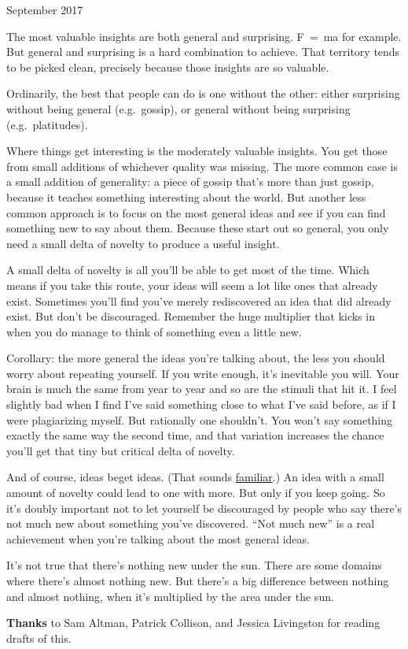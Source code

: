 September 2017

The most valuable insights are both general and surprising. F~=~ma for
example. But general and surprising is a hard combination to achieve.
That territory tends to be picked clean, precisely because those
insights are so valuable.

Ordinarily, the best that people can do is one without the other: either
surprising without being general (e.g.~gossip), or general without being
surprising (e.g.~platitudes).

Where things get interesting is the moderately valuable insights. You
get those from small additions of whichever quality was missing. The
more common case is a small addition of generality: a piece of gossip
that's more than just gossip, because it teaches something interesting
about the world. But another less common approach is to focus on the
most general ideas and see if you can find something new to say about
them. Because these start out so general, you only need a small delta of
novelty to produce a useful insight.

A small delta of novelty is all you'll be able to get most of the time.
Which means if you take this route, your ideas will seem a lot like ones
that already exist. Sometimes you'll find you've merely rediscovered an
idea that did already exist. But don't be discouraged. Remember the huge
multiplier that kicks in when you do manage to think of something even a
little new.

Corollary: the more general the ideas you're talking about, the less you
should worry about repeating yourself. If you write enough, it's
inevitable you will. Your brain is much the same from year to year and
so are the stimuli that hit it. I feel slightly bad when I find I've
said something close to what I've said before, as if I were plagiarizing
myself. But rationally one shouldn't. You won't say something exactly
the same way the second time, and that variation increases the chance
you'll get that tiny but critical delta of novelty.

And of course, ideas beget ideas. (That sounds
\href{ecw.html}{familiar}.) An idea with a small amount of novelty could
lead to one with more. But only if you keep going. So it's doubly
important not to let yourself be discouraged by people who say there's
not much new about something you've discovered. ``Not much new'' is a
real achievement when you're talking about the most general ideas.

It's not true that there's nothing new under the sun. There are some
domains where there's almost nothing new. But there's a big difference
between nothing and almost nothing, when it's multiplied by the area
under the sun.

\textbf{Thanks} to Sam Altman, Patrick Collison, and Jessica Livingston
for reading drafts of this.
